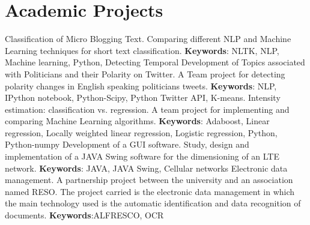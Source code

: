 \documentclass[11pt,a4paper,sans]{moderncv}        %
\begin{document}

	\section{Academic Projects} %
		\label{sec:academic_projects}

				{Classification of Micro Blogging Text. 
				\newline{}
				Comparing different NLP and Machine Learning techniques for short text classification.
				\newline{}
				\textbf{Keywords}: NLTK, NLP, Machine learning, Python,  
				}		
				{Detecting Temporal Development of Topics associated with Politicians and their Polarity on Twitter. 
				\newline{}
				A Team project for detecting polarity changes in English speaking politicians tweets.
				\newline{}
				\textbf{Keywords}: NLP, IPython notebook, Python-Scipy, Python Twitter API, K-means.
				}		
				{Intensity estimation: classification vs. regression. 
				\newline{}
				A team project for implementing and comparing Machine Learning algorithms.
				\newline{}
				\textbf{Keywords}: Adaboost, Linear regression, Locally weighted linear regression, Logistic regression, Python, Python-numpy
				}
				{Development of a GUI software. 
				\newline{}
				Study, design and implementation of a JAVA Swing software for the dimensioning of an LTE network.
				\newline{}
				\textbf{Keywords}: JAVA, JAVA Swing, Cellular networks
				}
				{Electronic data management.  
				\newline{}
				A partnership project between the university and an association named RESO. The project carried is the electronic data management in which the main technology used is the automatic identification and data recognition of documents.			
				\newline{}
				\textbf{Keywords}:ALFRESCO, OCR
				}
	
\end{document}
